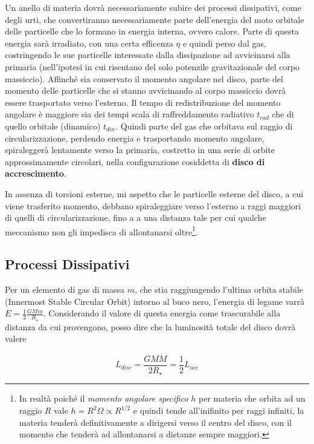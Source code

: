 \documentclass[a4paperbi]{article}
\begin{document}
	Un anello di materia dovrà necessariamente subire dei processi dissipativi, come degli urti, che convertiranno necessariamente parte dell'energia del moto orbitale delle particelle che lo formano in energia interna, ovvero calore. Parte di questa energia sarà irradiato, con una certa efficenza $\eta$ e quindi perso dal gas, costringendo le sue particelle interessate dalla dissipazione ad avvicinarsi alla primaria (nell'ipotesi in cui risentano del solo potenzile gravitazionale del corpo massiccio). 
	Affinché sia conservato il momento angolare nel disco, parte del momento delle particelle che si stanno avvicinando al corpo massiccio dovrà essere trasportato verso l'esterno. Il tempo di redistribuzione del momento angolare è maggiore sia dei tempi scala di raffreddamento radiativo $t_{rad}$ che di quello orbitale (dinamico) $t_{din}$. Quindi parte del gas che orbitava sul raggio di circularizzazione, perdendo energia e trasportando momento angolare, spiraleggerà lentamente verso la primaria, costretto in una serie di orbite approssimamente circolari, nella configurazione cosiddetta di \textbf{disco di accrescimento}. 	
	
	In assenza di torsioni esterne, mi aspetto che le particelle esterne del disco, a cui viene trasferito momento, debbano spiraleggiare verso l'esterno a raggi maggiori di quelli di circularizzazione, fino a a una distanza tale per cui qualche meccanismo non gli impedisca di allontanarsi oltre\footnote{In realtà poiché il \textit{momento angolare specifico} $h$ per materia che orbita ad un raggio $R$ vale $h=R^2\Omega\propto R^{1/2}$ e quindi tende all'inifinito per raggi infiniti, la materia tenderà definitivamente a dirigersi verso il centro del disco, con il momento che tenderà ad allontanarsi a distanze sempre maggiori.}.
		
\subsection{Processi Dissipativi}
	Per un elemento di gas di massa $m$, che stia raggiungendo l'ultima orbita stabile (Innermost Stable Circular Orbit) intorno al buco nero, l'energia di legame varrà $E=\frac{1}{2}\frac{GMm}{R_\star}$. Considerando il valore di questa energia come trascurabile alla distanza da cui provengono, posso dire che la luminosità totale del disco dovrà valere
	
	\begin{equation}
		L_{disc}=\frac{GM\dot{M}}{2R_\star}=\frac{1}{2}L_{acc}
	\end{equation}
\end{document}
